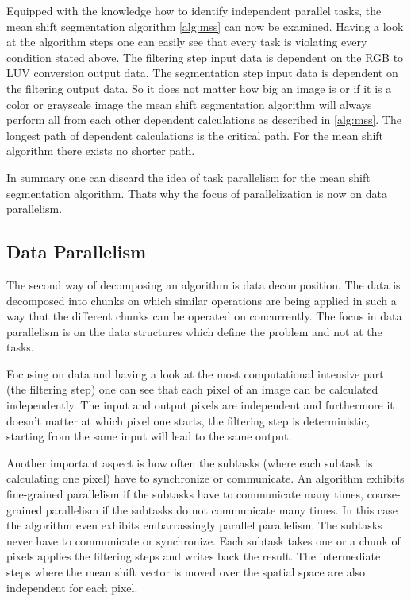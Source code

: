 Equipped with the knowledge how to identify independent parallel
tasks, the mean shift segmentation algorithm \autoref{alg:mss} can now
be examined.  Having a look at the algorithm steps one can easily see
that every task is violating every condition stated above. The
filtering step input data  is dependent on the \gls{RGB} to \gls{LUV}
conversion output data. The segmentation step input data is dependent
on the filtering output data. So it does not matter how
big an image is or if it is a color or grayscale image the mean shift
segmentation algorithm will always perform all from each other
dependent calculations as described in \autoref{alg:mss}. The longest
path of dependent calculations is the critical path. For the mean
shift algorithm there exists no shorter path.

In summary one can discard the idea of task parallelism for the mean
shift segmentation algorithm. Thats why the focus of parallelization
is now on data parallelism.


\subsection{Data Parallelism} %
\label{sub:data_parallelism}
The second way of decomposing an algorithm is data decomposition. The
data is decomposed into chunks on which similar operations are being
applied in such a way that the different chunks can be operated on
concurrently. The focus in data parallelism is on the data structures
which define the problem and not at the tasks.

Focusing on data and having a look at the most computational intensive
part (the filtering step) one can see that each pixel of an image can
be calculated independently. The input and output pixels are
independent and furthermore it doesn't matter at which pixel one
starts, the filtering step is deterministic, starting from the same
input will lead to the same output.

Another important aspect is how often the subtasks (where each subtask
is calculating one pixel) have to synchronize or communicate. An
algorithm exhibits fine-grained parallelism if the subtasks have to
communicate many times, coarse-grained parallelism if the subtasks do
not communicate many times. In this case the algorithm even exhibits
embarrassingly parallel parallelism. The subtasks never have to
communicate or synchronize. Each subtask takes one or a chunk of
pixels applies the filtering steps and writes back the result. The
intermediate steps where the mean shift vector is moved over the
spatial space are also independent for each pixel.


